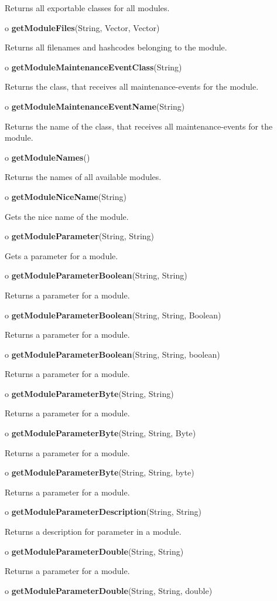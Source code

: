 \begin{description}
Returns all exportable classes for all modules.  
\item o {\bf getModuleFiles}(String, Vector, Vector)  

Returns all filenames and hashcodes belonging to the module.  
\item o {\bf getModuleMaintenanceEventClass}(String)  

Returns the class, that receives all maintenance-events for the module.  
\item o {\bf getModuleMaintenanceEventName}(String)  

Returns the name of the class, that receives all maintenance-events for the
module.  
\item o {\bf getModuleNames}()  

Returns the names of all available modules.  
\item o {\bf getModuleNiceName}(String)  

Gets the nice name of the module.  
\item o {\bf getModuleParameter}(String, String)  

Gets a parameter for a module.  
\item o {\bf getModuleParameterBoolean}(String, String)  

Returns a parameter for a module.  
\item o {\bf getModuleParameterBoolean}(String, String, Boolean)  

Returns a parameter for a module.  
\item o {\bf getModuleParameterBoolean}(String, String, boolean)  

Returns a parameter for a module.  
\item o {\bf getModuleParameterByte}(String, String)  

Returns a parameter for a module.  
\item o {\bf getModuleParameterByte}(String, String, Byte)  

Returns a parameter for a module.  
\item o {\bf getModuleParameterByte}(String, String, byte)  

Returns a parameter for a module.  
\item o {\bf getModuleParameterDescription}(String, String)  

Returns a description for parameter in a module.  
\item o {\bf getModuleParameterDouble}(String, String)  

Returns a parameter for a module.  
\item o {\bf getModuleParameterDouble}(String, String, double)  


\end{description}
